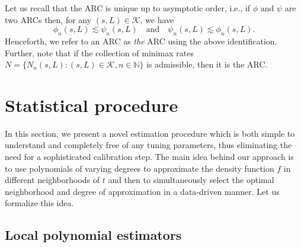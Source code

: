 \documentclass[bj,authoryear]{imsart}
\numberwithin{equation}{section}
\theoremstyle{plain}
\theoremstyle{remark}
\newcommand{\N}{\mathbb{N}}
\newcommand{\1}{\mathds{1}}
\begin{document}
    Let us recall that the ARC is unique up to asymptotic order, i.e., if $\phi$ and $\psi$ are two ARCs then, for any $(s,L)\in \mathcal{K}$, we have
    \begin{equation*}
        \phi_n(s,L) \lesssim \psi_n(s,L)
        \quad \text{and} \quad
        \psi_n(s,L) \lesssim \phi_n(s,L).
    \end{equation*}
    Henceforth, we refer to an ARC as \textit{the} ARC using the above identification.
    Further, note that if the collection of minimax rates $N = \{N_n(s,L) : (s,L)\in \mathcal{K}, n\in \N\}$ is admissible, then it is the ARC.


\section{Statistical procedure}\label{sec:statistical.procedure}

    In this section, we present a novel estimation procedure which is both simple to understand and completely free of any tuning parameters, thus eliminating the need for a sophisticated calibration step. The main idea behind our approach is to use polynomials of varying degrees to approximate the density function $f$ in different neighborhoods of $t$ and then to simultaneously select the optimal neighborhood and degree of approximation in a data-driven manner. Let us formalize this idea.

\subsection{Local polynomial estimators}\label{sec:locpoly}
\end{document}
